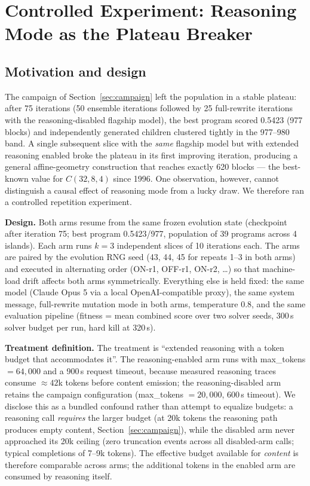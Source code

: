 \section{Controlled Experiment: Reasoning Mode as the Plateau
Breaker}\label{sec:experiment}

\subsection{Motivation and design}

The campaign of Section~\ref{sec:campaign} left the population in a
stable plateau: after 75 iterations (50 ensemble iterations followed
by 25 full-rewrite iterations with the reasoning-disabled flagship
model), the best program scored 0.5423 (977 blocks) and independently
generated children clustered tightly in the 977--980 band. A single
subsequent slice with the \emph{same} flagship model but with
extended reasoning enabled broke the plateau in its first improving
iteration, producing a general affine-geometry construction that
reaches exactly 620 blocks --- the best-known value for $C(32,8,4)$
since 1996. One observation, however, cannot distinguish a causal
effect of reasoning mode from a lucky draw. We therefore ran a
controlled repetition experiment.

\textbf{Design.} Both arms resume from the same frozen evolution
state (checkpoint after iteration 75; best program 0.5423/977,
population of 39 programs across 4 islands). Each arm runs $k=3$
independent slices of 10 iterations each. The arms are paired by the
evolution RNG seed (43, 44, 45 for repeats 1--3 in both arms) and
executed in alternating order (ON-r1, OFF-r1, ON-r2, \ldots) so that
machine-load drift affects both arms symmetrically. Everything else
is held fixed: the same model (Claude Opus 5 via a local
OpenAI-compatible proxy), the same system message, full-rewrite
mutation mode in both arms, temperature 0.8, and the same evaluation
pipeline (fitness = mean combined score over two solver seeds, 300\,s
solver budget per run, hard kill at 320\,s).

\textbf{Treatment definition.} The treatment is ``extended reasoning
with a token budget that accommodates it''. The reasoning-enabled arm
runs with max\_tokens $=64{,}000$ and a 900\,s request timeout,
because measured reasoning traces consume ${\approx}42$k tokens
before content emission; the reasoning-disabled arm retains the
campaign configuration (max\_tokens $=20{,}000$, 600\,s timeout). We
disclose this as a bundled confound rather than attempt to equalize
budgets: a reasoning call \emph{requires} the larger budget (at 20k
tokens the reasoning path produces empty content,
Section~\ref{sec:campaign}), while the disabled arm never approached
its 20k ceiling (zero truncation events across all disabled-arm
calls; typical completions of 7--9k tokens). The effective budget
available for \emph{content} is therefore comparable across arms; the
additional tokens in the enabled arm are consumed by reasoning
itself.

